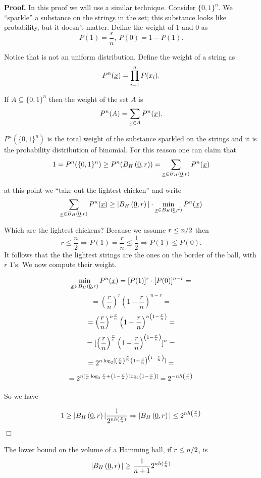 \noindent\textbf{Proof.} In this proof we will use a similar technique. Consider $\{0, 1\}^n$. We ``sparkle'' a substance on the strings in the set; this substance looks like probability, but it doesn't matter. Define the weight of $1$ and $0$ as 
$$P(1) = \dfrac{r}{n},\ P(0) = 1 - P(1).$$

Notice that is not an uniform distribution. Define the weight of a string as
$$P^n(\underline{x}) = \prod_{i = 1}^n P(x_i).$$

If $A \subseteq \{0, 1\}^n$ then the weight of the set $A$ is $$P^n(A) = \sum_{\underline{x} \in A} P^n(\underline{x}).$$

$P^n(\{0, 1\}^n)$ is the total weight of the substance sparkled on the strings and it is the probability distribution of binomial. For this reason one can claim that
$$1 = P^n(\{0, 1\}^n) \geq P^n(B_H\left(\underline{0}, r\right)) = \sum_{\underline{x} \in B_H\left(\underline{0}, r\right)} P^n(\underline{x})$$

at this point we ``take out the lightest chicken'' and write
$$\sum_{\underline{x} \in B_H\left(\underline{0}, r\right)} P^n(\underline{x}) \geq |B_H\left(\underline{0}, r\right)| \cdot \min_{\underline{x} \in B_H\left(\underline{0}, r\right)}P^n(\underline{x})$$

Which are the lightest chickens? Because we assume $r \leq {n}/{2}$ then
$$r \leq \dfrac{n}{2} \Rightarrow P(1) = \dfrac{r}{n} \leq \dfrac{1}{2} \Rightarrow P(1) \leq P(0).$$
It follows that the the lightest strings are the ones on the border of the ball, with $r$ $1$'s. We now compute their weight.

\[\min_{\underline{x} \in B_H\left(\underline{0}, r\right)}P^n(\underline{x}) = [P(1)]^r\cdot[P(0)]^{n-r} = \] 
\[ = \left(\dfrac{r}{n}\right)^r \left(1 - \dfrac{r}{n}\right)^{n-r} = \]  \[ = \left(\dfrac{r}{n}\right)^{n\frac{r}{n}} \left(1 - \dfrac{r}{n}\right)^{n\left(1 - \frac{r}{n}\right)} =\]
\[ = [\left(\dfrac{r}{n}\right)^{\frac{r}{n}} \left(1 - \dfrac{r}{n}\right)^{\left(1 - \frac{r}{n}\right)}]^n =\] 
\[ =2^{n\log_2[\left(\frac{r}{n}\right)^{\frac{r}{n}}  \left(1 - \frac{r}{n}\right)^{\left(1 - \frac{r}{n}\right)}]} = \]
\[ =2^{n[\frac{r}{n}\log_2\frac{r}{n} + \left(1 - \frac{r}{n}\right)\log_2\left(1 - \frac{r}{n}\right)]} = 2^{-nh\left(\frac{r}{n}\right)}\]

So we have 

\[1 \geq |B_H\left(\underline{0}, r\right)| \dfrac{1}{2^{nh(\frac{r}{n})}} \Rightarrow |B_H\left(\underline{0}, r\right)| \leq 2^{nh\left(\frac{r}{n}\right)}\] 
\hfill$\Box$


\begin{thm}
	The lower bound on the volume of a Hamming ball, if $ r \leq {n}/{2}$, is
	$$|B_H\left(\underline{0}, r\right)| \geq \dfrac{1}{n+1}2^{nh(\frac{r}{n})}$$
\end{thm}

